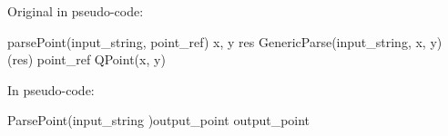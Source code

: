 \documentclass[10pt]{amsart}
\begin{document}
\begin{codex}
\label{codex:functionReturn}
Original in pseudo-code:
\begin{offsideBlue}
\begin{PVerbatim}
  \ctype[bool] parsePoint(\ctype[String] input_string, \ctype[QPoint&] point_ref)
     \ctype[int] x, y
     res \cop[:=] GenericParse(input_string, \cop[&]x, \cop[&]y)
     \ckw[if] (\cop[!]res)\cop[:]
        \ckw[return] \ckw[false]
     \cend
     point_ref \cop[:=] QPoint(x, y)
     \ckw[return] \ckw[true]
  \cend
\end{PVerbatim}
\end{offsideBlue}
In \Utop pseudo-code:
\begin{offsideBlue}
\begin{PVerbatim}
  \ckw[function] ParsePoint(input_string \ctype[String])\cop[:]
  \cop[|-->] output_point \ctype[QPoint]
  \cop[|++>] \clab[Fail] \ckw[assures] output_point \cop[@] \ctype[uninit]


\end{PVerbatim}
\end{offsideBlue}
\end{codex}
\end{document}
